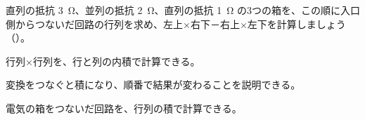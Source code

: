 \bkproblem 直列の抵抗 \qty{3}{\ohm}、並列の抵抗 \qty{2}{\ohm}、直列の抵抗 \qty{1}{\ohm} の3つの箱を、この順に入口側からつないだ回路の行列を求め、左上×右下－右上×左下を計算しましょう\mbox{（）}。

\begin{furikaeri}
\begin{checklist}
\item 行列×行列を、行と列の内積で計算できる。
\item 変換をつなぐと積になり、順番で結果が変わることを説明できる。
\item 電気の箱をつないだ回路を、行列の積で計算できる。
\end{checklist}
\end{furikaeri}

